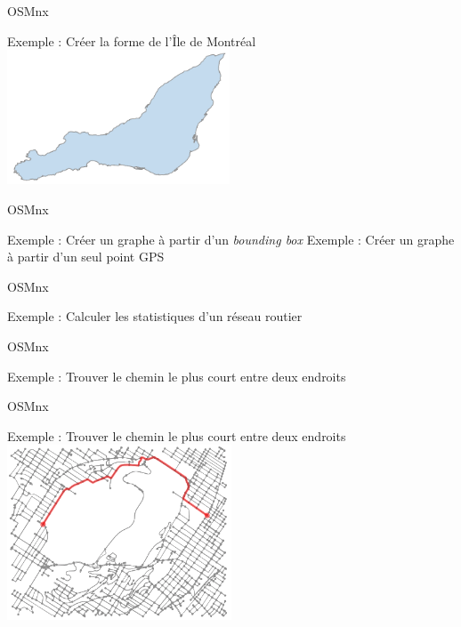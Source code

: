 \documentclass[aspectratio=169]{beamer}
\begin{document}
\begin{frame}{OSMnx \cite{boeing2017osmnx}}

{\Large Exemple : Créer la forme de l'Île de Montréal}
{\small }
\centering
\includegraphics[height=4cm]{figures/montreal_shape}

\end{frame}

\begin{frame}{OSMnx \cite{boeing2017osmnx}}

{\Large Exemple : Créer un graphe à partir d'un \textit{bounding box}}
{\small }
\vspace{.5cm}
{\Large Exemple : Créer un graphe à partir d'un seul point GPS}
{\small }

\end{frame}

\begin{frame}{OSMnx \cite{boeing2017osmnx}}

{\Large Exemple : Calculer les statistiques d'un réseau routier}
{\small }
{\small }

\end{frame}

\begin{frame}{OSMnx \cite{boeing2017osmnx}}

{\Large Exemple : Trouver le chemin le plus court entre deux endroits}
{\footnotesize }

\end{frame}

\begin{frame}{OSMnx \cite{boeing2017osmnx}}

{\Large Exemple : Trouver le chemin le plus court entre deux endroits}
\centering
\includegraphics[width=0.5\textwidth]{figures/shortest_path}

\end{frame}
\end{document}
